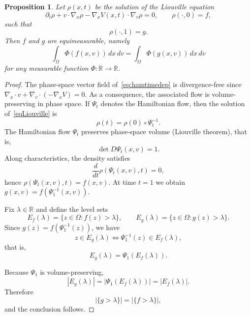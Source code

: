 \documentclass[10pt,a4paper]{amsart}
\newtheorem{proposition}{Proposition}
\newcommand{\R}{{\mathbb R}}
\begin{document}
\begin{proposition}
\label{prop:equimeasurable}
Let $\rho(x,t)$ be the solution 
of the Liouville equation
\[
\partial_t\rho + v\cdot\nabla_x\rho - \nabla_x V(x,t)\cdot\nabla_v\rho = 0,
\qquad
\rho(\cdot,0)=f,
\]
such that 
\[
\rho(\cdot,1)=g .
\]
Then $f$ and $g$ are equimeasurable, namely
\[
        \int_{\Omega} \Phi(f(x,v))\,dx\,dv
        =
        \int_{\Omega} \Phi(g(x,v))\,dx\,dv
\]
for any measurable function $\Phi:\R \to \R$.
\end{proposition}

\begin{proof}
The phase-space vector field of~\eqref{eq:hamtimedep} is divergence-free 
since $\nabla_x\cdot v+\nabla_v\cdot(-\nabla_x V)=0$.
As a consequence, the associated flow is volume-preserving in phase space.
If \(\Psi_t\) denotes the Hamiltonian flow, then the solution of~\eqref{eqLiouville} is
\[
        \rho(t)=\rho(0)\circ \Psi_t^{-1}.
\]
The Hamiltonian flow $\Psi_t$ preserves phase-space volume
(Liouville theorem), that is,
\[
\det D\Psi_t(x,v)=1 .
\]
Along characteristics, the density satisfies
\[
\frac{d}{dt}\rho(\Psi_t(x,v),t)=0,
\]
hence $\rho(\Psi_t(x,v),t)=f(x,v)$. At time $t=1$ we obtain $g(x,v)=f(\Psi_1^{-1}(x,v))$. 

Fix $\lambda\in\R$ and define the level sets
\[
E_f(\lambda)
=
\{z\in\Omega:f(z)>\lambda\},
\qquad
E_g(\lambda)
=
\{z\in\Omega:g(z)>\lambda\}.
\]
Since $g(z)=f(\Psi_1^{-1}(z))$, we have
\[
z\in E_g(\lambda)
\iff
\Psi_1^{-1}(z)\in E_f(\lambda),
\]
that is,
\[
E_g(\lambda)=\Psi_1(E_f(\lambda)).
\]

Because $\Psi_1$ is volume-preserving,
\[
|E_g(\lambda)|
=
|\Psi_1(E_f(\lambda))|
=
|E_f(\lambda)|.
\]
Therefore
\[
|\{g>\lambda\}|
=
|\{f>\lambda\}|,
\]
and the conclusion follows.
\end{proof}
\end{document}
